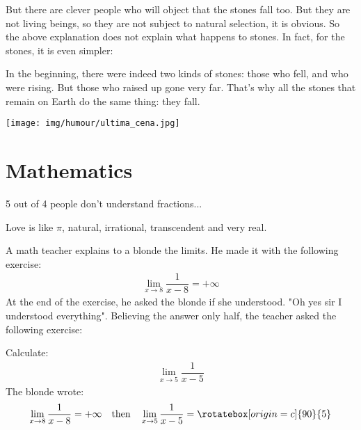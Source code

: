 But there are clever people who will object that the stones fall too. But they are not living beings, so they are not subject to natural selection, it is obvious. So the above explanation does not explain what happens to stones. In fact, for the stones, it is even simpler:

In the beginning, there were indeed two kinds of stones: those who fell, and who were rising. But those who raised up gone very far. That's why all the stones that remain on Earth do the same thing: they fall.

\begin{center}\underline{\hspace{5 cm}}\end{center}

	\begin{center}
		\texttt{[image: img/humour/ultima\_cena.jpg]}	
	\end{center}

	\pagebreak
	\section{Mathematics}

5 out of 4 people don't understand fractions...
	\begin{center}\underline{\hspace{5 cm}}\end{center}

Love is like $\pi$, natural, irrational, transcendent and very real.
	\begin{center}\underline{\hspace{5 cm}}\end{center}

A math teacher explains to a blonde the limits. He made it with the following exercise:
	\begin{gather*}
	\lim_{x \rightarrow 8} \dfrac{1}{x-8}=+\infty
	\end{gather*}
At the end of the exercise, he asked the blonde if she understood. "Oh yes sir I understood everything". Believing the answer only half, the teacher asked the following exercise:

Calculate:
	\begin{gather*}
	\lim_{x \rightarrow 5} \dfrac{1}{x-5}
	\end{gather*}
The blonde wrote: 
	\begin{gather*}
	\lim_{x \rightarrow 8} \dfrac{1}{x-8}=+\infty \quad  \text{then} \quad \lim_{x \rightarrow 5} \dfrac{1}{x-5}= \rotatebox[origin=c]{90}{5}  
	\end{gather*}
	\begin{center}\underline{\hspace{5 cm}}\end{center}
	
